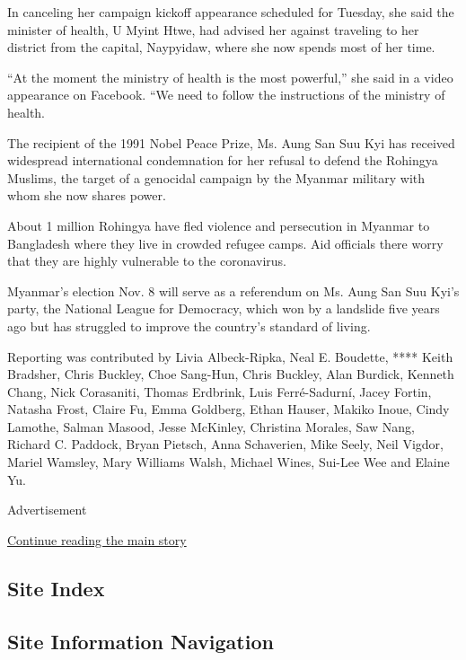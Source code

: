 In canceling her campaign kickoff appearance scheduled for Tuesday, she
said the minister of health, U Myint Htwe, had advised her against
traveling to her district from the capital, Naypyidaw, where she now
spends most of her time.

``At the moment the ministry of health is the most powerful,'' she said
in a video appearance on Facebook. ``We need to follow the instructions
of the ministry of health.

The recipient of the 1991 Nobel Peace Prize, Ms. Aung San Suu Kyi has
received widespread international condemnation for her refusal to defend
the Rohingya Muslims, the target of a genocidal campaign by the Myanmar
military with whom she now shares power.

About 1 million Rohingya have fled violence and persecution in Myanmar
to Bangladesh where they live in crowded refugee camps. Aid officials
there worry that they are highly vulnerable to the coronavirus.

Myanmar's election Nov. 8 will serve as a referendum on Ms. Aung San Suu
Kyi's party, the National League for Democracy, which won by a landslide
five years ago but has struggled to improve the country's standard of
living.

Reporting was contributed by Livia Albeck-Ripka, Neal E. Boudette, ****
Keith Bradsher, Chris Buckley, Choe Sang-Hun, Chris Buckley, Alan
Burdick, Kenneth Chang, Nick Corasaniti, Thomas Erdbrink, Luis
Ferré-Sadurní, Jacey Fortin, Natasha Frost, Claire Fu, Emma Goldberg,
Ethan Hauser, Makiko Inoue, Cindy Lamothe, Salman Masood, Jesse
McKinley, Christina Morales, Saw Nang, Richard C. Paddock, Bryan
Pietsch, Anna Schaverien, Mike Seely, Neil Vigdor, Mariel Wamsley, Mary
Williams Walsh, Michael Wines, Sui-Lee Wee and Elaine Yu.

Advertisement

\protect\hyperlink{after-bottom}{Continue reading the main story}

\hypertarget{site-index}{%
\subsection{Site Index}\label{site-index}}

\hypertarget{site-information-navigation}{%
\subsection{Site Information
Navigation}\label{site-information-navigation}}

